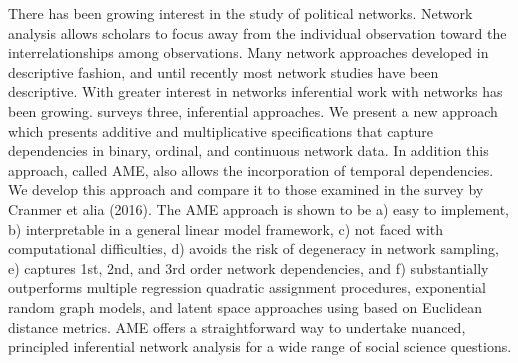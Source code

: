 There has been growing interest in the study of political networks. Network analysis allows scholars to focus away from the individual observation toward the interrelationships among observations.   Many network approaches developed in descriptive fashion, and until recently most network studies have been descriptive. With greater interest in networks inferential work with networks has been growing.   \citet{cranmer:etal:2016} surveys three, inferential approaches.  We present a new approach which presents additive and multiplicative specifications that capture dependencies in binary, ordinal, and continuous network data. In addition this approach, called AME,  also allows the incorporation of temporal dependencies.  We develop this approach and compare it to those examined in the survey by Cranmer et alia (2016).  The AME approach is shown to be a) easy to implement, b) interpretable in a general linear model framework, c) not faced with computational difficulties, d) avoids the risk of degeneracy in network sampling, e) captures 1st, 2nd, and 3rd order network dependencies, and f) substantially outperforms multiple regression quadratic assignment procedures, exponential random graph models, and latent space approaches using based on Euclidean distance metrics. AME offers a straightforward way to undertake nuanced, principled inferential network analysis for a wide range of social science questions. 

 